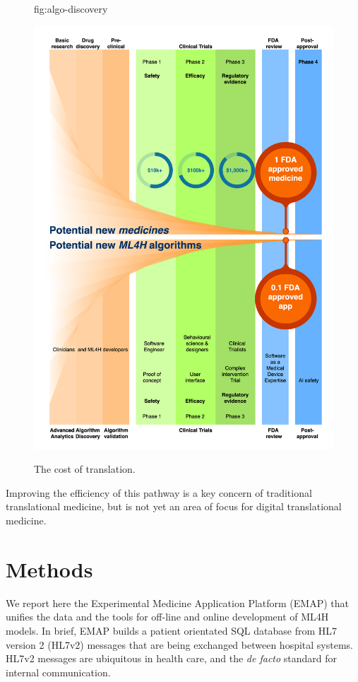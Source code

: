 \documentclass[pmlr,twocolumn,10pt]{jmlr} %
\begin{document}
\begin{figure}[t]
\floatconts
  {fig:algo-discovery}
  {\caption{The cost of translation.}}
 {\includegraphics[width=1.0\linewidth]{images/emap-summary-funnel.png}}

\end{figure}

Improving the efficiency of this pathway is a key concern of traditional translational medicine\citep{woolf2008}, but is not yet an area of focus for digital translational medicine.

\section{Methods}
We report here the Experimental Medicine Application Platform (EMAP) that unifies the data and the tools for off-line and online development of ML4H models. In brief, EMAP builds a patient orientated SQL database from HL7 version 2 (HL7v2) messages that are being exchanged between hospital systems. HL7v2 messages are ubiquitous in health care, and the \textit{de facto} standard for internal communication.
\end{document}
